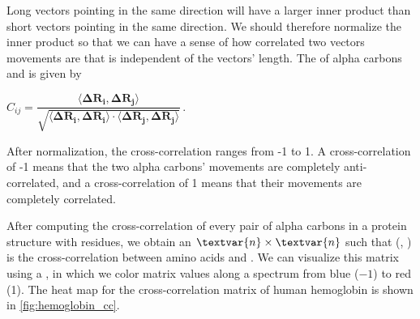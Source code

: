 \begin{note}\end{note}

Long vectors pointing in the same direction will have a larger inner product than short vectors pointing in the same direction. We should therefore normalize the inner product so that we can have a sense of how correlated two vectors movements are that is independent of the vectors' length. The  of alpha carbons  and  is given by

\begin{center}
$ C_{ij} = \dfrac{\langle \mathbf{\Delta R_i}, \mathbf{\Delta R_j} \rangle}{\sqrt{\langle \mathbf{\Delta R_i}, \mathbf{\Delta R_i} \rangle \cdot \langle \mathbf{\Delta R_j}, \mathbf{\Delta R_j} \rangle}}$\,.
\end{center}

After normalization, the cross-correlation ranges from -1 to 1. A cross-correlation of -1 means that the two alpha carbons' movements are completely anti-correlated, and a cross-correlation of 1 means that their movements are completely correlated.

After computing the cross-correlation of every pair of alpha carbons in a protein structure with  residues, we obtain an $\textvar{n} \times \textvar{n}$   such that (, ) is the cross-correlation between amino acids  and . We can visualize this matrix using a , in which we color matrix values along a spectrum from blue ($-1$) to red (1). The heat map for the cross-correlation matrix of human hemoglobin is shown in \autoref{fig:hemoglobin_cc}.\\

